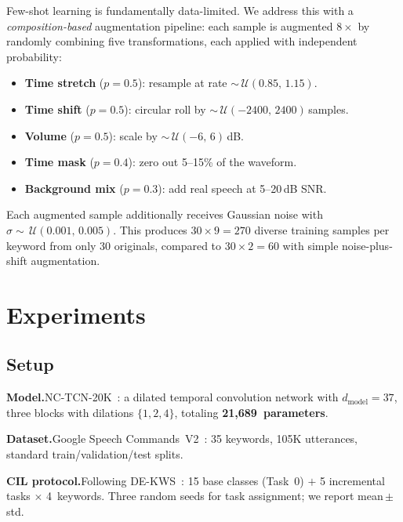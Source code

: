 \documentclass{Interspeech}
\begin{document}
Few-shot learning is fundamentally data-limited.
We address this with a \emph{composition-based} augmentation pipeline: each sample is augmented $8{\times}$ by randomly combining five transformations, each applied with independent probability:

\smallskip
\begin{itemize}
\setlength\itemsep{1pt}
\item \textbf{Time stretch} ($p{=}0.5$): resample at rate ${\sim}\,\mathcal{U}(0.85,\,1.15)$.
\item \textbf{Time shift} ($p{=}0.5$): circular roll by ${\sim}\,\mathcal{U}(-2400,\,2400)$\,samples.
\item \textbf{Volume} ($p{=}0.5$): scale by ${\sim}\,\mathcal{U}(-6,\,6)$\,dB.
\item \textbf{Time mask} ($p{=}0.4$): zero out 5--15\% of the waveform.
\item \textbf{Background mix} ($p{=}0.3$): add real speech at 5--20\,dB SNR.
\end{itemize}
\smallskip

\noindent Each augmented sample additionally receives Gaussian noise with $\sigma {\sim}\,\mathcal{U}(0.001,\,0.005)$.
This produces $30{\times}9{=}270$ diverse training samples per keyword from only 30 originals, compared to $30{\times}2{=}60$ with simple noise-plus-shift augmentation.

\section{Experiments}
\label{sec:experiments}

\subsection{Setup}

\noindent\textbf{Model.}\quad NC-TCN-20K~\cite{choi2025nanomamba}: a dilated temporal convolution network with $d_\text{model}{=}37$, three blocks with dilations $\{1,2,4\}$, totaling \textbf{21,689~parameters}.

\noindent\textbf{Dataset.}\quad Google Speech Commands~V2~\cite{warden2018speech}: 35 keywords, 105K utterances, standard train/validation/test splits.

\noindent\textbf{CIL protocol.}\quad Following DE-KWS~\cite{peng2024dekws}: 15 base classes (Task~0) $+$ 5 incremental tasks $\times$ 4~keywords.
Three random seeds for task assignment; we report mean\,$\pm$\,std.
\end{document}
